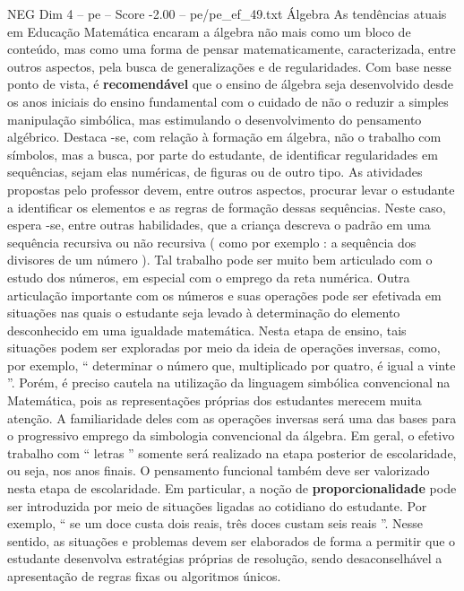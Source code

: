 \begin{textsample}{NEG Dim 4 – pe – Score -2.00 – pe/pe\_ef\_49.txt}  \label{ex:f4_neg_009}
Álgebra As tendências atuais em Educação Matemática encaram a álgebra não mais como um bloco de conteúdo, mas como uma forma de pensar matematicamente, caracterizada, entre outros aspectos, pela busca de generalizações e de regularidades.
Com base nesse ponto de vista, é \textbf{recomendável} que o ensino de álgebra seja desenvolvido desde os anos iniciais do ensino fundamental com o cuidado de não o reduzir a simples manipulação simbólica, mas estimulando o desenvolvimento do pensamento algébrico.
Destaca -se, com relação à formação em álgebra, não o trabalho com símbolos, mas a busca, por parte do estudante, de identificar regularidades em sequências, sejam elas numéricas, de figuras ou de outro tipo.
As atividades propostas pelo professor devem, entre outros aspectos, procurar levar o estudante a identificar os elementos e as regras de formação dessas sequências.
Neste caso, espera -se, entre outras habilidades, que a criança descreva o padrão em uma sequência recursiva ou não recursiva ( como por exemplo : a sequência dos divisores de um número ).
Tal trabalho pode ser muito bem articulado com o estudo dos números, em especial com o emprego da reta numérica.
Outra articulação importante com os números e suas operações pode ser efetivada em situações nas quais o estudante seja levado à determinação do elemento desconhecido em uma igualdade matemática.
Nesta etapa de ensino, tais situações podem ser exploradas por meio da ideia de operações inversas, como, por exemplo, “ determinar o número que, multiplicado por quatro, é igual a vinte ”.
Porém, é preciso cautela na utilização da linguagem simbólica convencional na Matemática, pois as representações próprias dos estudantes merecem muita atenção.
A familiaridade deles com as operações inversas será uma das bases para o progressivo emprego da simbologia convencional da álgebra.
Em geral, o efetivo trabalho com “ letras ” somente será realizado na etapa posterior de escolaridade, ou seja, nos anos finais.
O pensamento funcional também deve ser valorizado nesta etapa de escolaridade.
Em particular, a noção de \textbf{proporcionalidade} pode ser introduzida por meio de situações ligadas ao cotidiano do estudante.
Por exemplo, “ se um doce custa dois reais, três doces custam seis reais ”.
Nesse sentido, as situações e problemas devem ser elaborados de forma a permitir que o estudante desenvolva estratégias próprias de resolução, sendo desaconselhável a apresentação de regras fixas ou algoritmos únicos.

\end{textsample}
